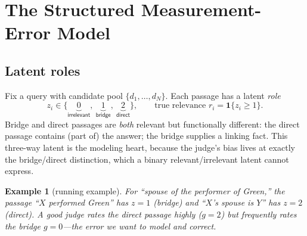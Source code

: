 \documentclass[11pt]{article}
\newtheorem{example}{Example}
\begin{document}
\section{The Structured Measurement-Error Model}\label{sec:model}
\subsection{Latent roles}
Fix a query with candidate pool $\{d_1,\dots,d_N\}$. Each passage has a latent \emph{role}
\begin{equation}
  z_i\in\{\underbrace{0}_{\textsf{irrelevant}},\ \underbrace{1}_{\textsf{bridge}},\ \underbrace{2}_{\textsf{direct}}\},
  \qquad \text{true relevance } r_i=\mathbf 1\{z_i\ge1\}.
\end{equation}
Bridge and direct passages are \emph{both} relevant but functionally different: the direct passage contains (part
of) the answer; the bridge supplies a linking fact. This three-way latent is the modeling heart, because the
judge's bias lives at exactly the bridge/direct distinction, which a binary relevant/irrelevant latent cannot
express.

\begin{example}[running example]
For ``spouse of the performer of Green,'' the passage ``$X$ performed Green'' has $z=1$ (bridge) and ``$X$'s
spouse is $Y$'' has $z=2$ (direct). A good judge rates the direct passage highly ($g{=}2$) but frequently rates
the bridge $g{=}0$---the error we want to model and correct.
\end{example}
\end{document}
